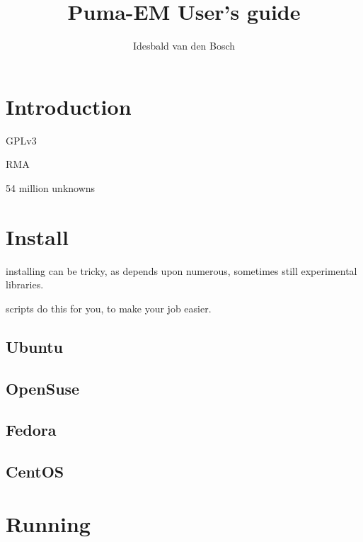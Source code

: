\documentclass[a4paper,10pt]{book}
\title{Puma-EM User's guide}
\author{Idesbald van den Bosch}
\begin{document}
\maketitle
\tableofcontents

\chapter{Introduction}
GPLv3

RMA

54 million unknowns


\chapter{Install}
installing can be tricky, as depends upon numerous, sometimes still experimental libraries.

scripts do this for you, to make your job easier.

\section{Ubuntu}

\section{OpenSuse}

\section{Fedora}

\section{CentOS}

\chapter{Running}
\end{document}
